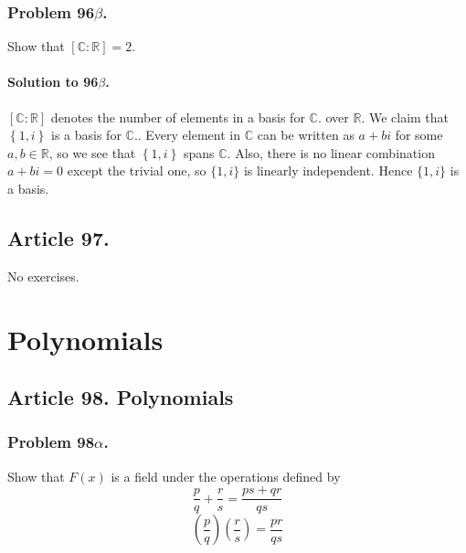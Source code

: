\subsubsection{Problem 96$\beta$.}
Show that $\left[ \mathbb{C} : \mathbb{R} \right] = 2$.

\paragraph{Solution to 96$\beta$.}
$\left[ \mathbb{C} : \mathbb{R} \right]$ denotes the number of elements in a
basis for $\mathbb{C} $. over $\mathbb{R}$. We claim that $\left\{ 1, i \right\}$
is a basis for $\mathbb{C}$.. Every element in $\mathbb{C}$ can be written as
$a + bi$ for some $a, b \in \mathbb{R}$, so we see that $\left\{ 1, i \right\}$
spans $\mathbb{C}$. Also, there is no linear combination $a + bi = 0$ except the
trivial one, so $\{ 1, i \}$ is linearly independent. Hence $\{ 1, i \}$ is a
basis.

\subsection{Article 97.}

No exercises.


\section{Polynomials}


\subsection{Article 98. Polynomials}

\subsubsection{Problem 98$\alpha$.}
Show that $F(x)$ is a field under the operations defined by
$$\frac{p}{q} + \frac{r}{s} = \frac{ps+qr}{qs}$$
$$\left(\frac{p}{q}\right)\left(\frac{r}{s}\right) = \frac{pr}{qs}$$

